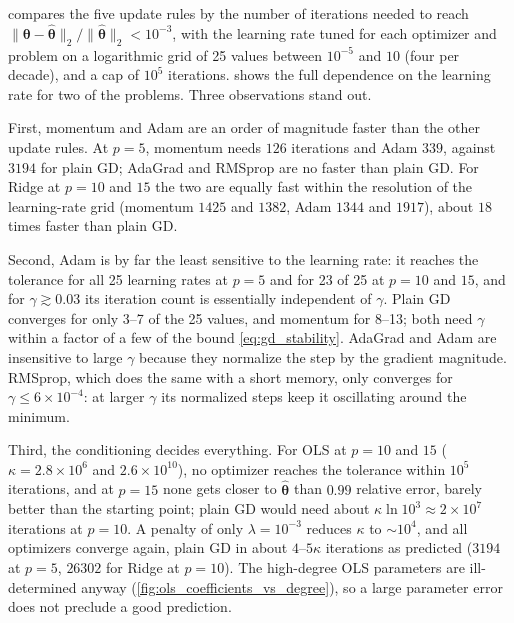  compares the five update rules by the number of
iterations needed to reach $\lVert\bm{\theta}-\hat{\bm{\theta}}\rVert_2 /
\lVert\hat{\bm{\theta}}\rVert_2 < 10^{-3}$, with the learning rate tuned for
each optimizer and problem on a logarithmic grid of 25 values between $10^{-5}$
and $10$ (four per decade), and a cap of $10^5$ iterations.
 shows the full dependence on the learning
rate for two of the problems. Three observations stand out.

First, momentum and Adam are an order of magnitude faster than the other
update rules. At $p=5$, momentum needs $126$ iterations and Adam $339$, against
$3194$ for plain GD; AdaGrad and RMSprop are no faster than plain GD. For Ridge
at $p=10$ and $15$ the two are equally fast within the resolution of the
learning-rate grid (momentum $1425$ and $1382$, Adam $1344$ and $1917$), about
$18$ times faster than plain GD.

Second, Adam is by far the least sensitive to the learning rate: it reaches the
tolerance for all 25 learning rates at $p=5$ and for 23 of 25 at $p = 10$ and
$15$, and for $\gamma \gtrsim 0.03$ its iteration count is essentially
independent of $\gamma$. Plain GD converges for only 3--7 of the 25 values, and
momentum for 8--13; both need $\gamma$ within a factor of a few of the bound
\cref{eq:gd_stability}. AdaGrad and Adam are insensitive to large $\gamma$
because they normalize the step by the gradient magnitude. RMSprop, which does
the same with a short memory, only converges for $\gamma \leq 6\times10^{-4}$:
at larger $\gamma$ its normalized steps keep it oscillating around the minimum.

Third, the conditioning decides everything. For OLS at $p = 10$ and $15$
($\kappa = 2.8\times10^6$ and $2.6\times10^{10}$), no optimizer reaches the
tolerance within $10^5$ iterations, and at $p=15$ none gets closer to
$\hat{\bm{\theta}}$ than $0.99$ relative error, barely better than the
starting point; plain GD would need about $\kappa\ln 10^3 \approx 2\times10^7$
iterations at $p=10$. A penalty of only $\lambda = 10^{-3}$ reduces $\kappa$ to
$\sim10^4$, and all optimizers converge again, plain GD in about $4$--$5\kappa$
iterations as predicted ($3194$ at $p=5$, $26302$ for Ridge at $p=10$). The
high-degree OLS parameters are ill-determined anyway
(\cref{fig:ols_coefficients_vs_degree}), so a large parameter error does not
preclude a good prediction.


\begin{table}[htbp]
    \centering
    \caption{Iterations to reach the closed-form OLS or Ridge ($\lambda =
    10^{-3}$) solution to a relative parameter error of $10^{-3}$, from
    $\bm{\theta} = \bm{0}$, with the learning rate tuned per optimizer and
    problem (reference training set, standardized features, degree $p$).
    $\kappa(\bm{H})$ is the condition number of the Hessian. In parentheses: the
    number of the 25 learning rates for which the tolerance was reached within
    $10^5$ iterations. ``--'': not reached for any learning rate; in brackets the
    smallest relative error reached. Bold: fastest.}
    \label{tab:optimizers}
    
\end{table}

